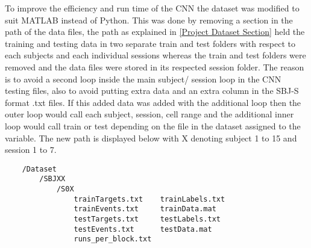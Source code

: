 To improve the efficiency and run time of the CNN the dataset was modified to suit MATLAB instead of Python. This was done by removing a section in the path of the data files, the path as explained in \cref{Project Dataset Section} held the training and testing data in two separate train and test folders with respect to each subjects and each individual sessions whereas the train and test folders were removed and the data files were stored in its respected session folder. The reason is to avoid a second loop inside the main subject/ session loop in the CNN testing files, also to avoid putting extra data and an extra column in the SBJ-S format .txt files. If this added data was added with the additional loop then the outer loop would call each subject, session, cell range and the additional inner loop would call train or test depending on the file in the dataset assigned to the variable. The new path is displayed below with X denoting subject 1 to 15 and session 1 to 7.


\begin{center}
    \begin{verbatim}
    /Dataset
        /SBJXX
            /S0X
                trainTargets.txt    trainLabels.txt
                trainEvents.txt     trainData.mat
                testTargets.txt     testLabels.txt
                testEvents.txt      testData.mat
                runs_per_block.txt
    \end{verbatim}
\end{center}